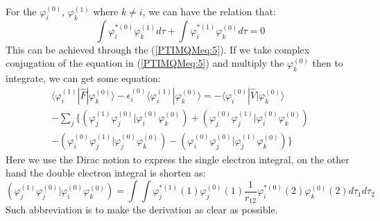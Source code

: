 For the $\varphi^{(0)}_{i}$, $\varphi^{(1)}_{k}$ where $k\neq i$, we
can have the relation that:
\begin{equation}\label{PTIMQMeq:9}
\int \varphi^{*(0)}_{i}\varphi^{(1)}_{k} d\tau  + \int
\varphi^{*(1)}_{i}\varphi^{(0)}_{k} d\tau = 0
\end{equation}
This can be achieved through the (\ref{PTIMQMeq:5}). If we take
complex conjugation of the equation in (\ref{PTIMQMeq:5}) and
multiply the $\varphi^{(0)}_{k}$ then to integrate, we can get some
equation:
\begin{multline}\label{PTIMQMeq:7}
\langle\varphi^{(1)}_{i}|\hat{F}|\varphi^{(0)}_{k}\rangle -
\epsilon^{(0)}_{i}\langle\varphi^{(1)}_{i}|\varphi^{(0)}_{k}\rangle
=
- \langle\varphi^{(0)}_{i}|\hat{V}|\varphi^{(0)}_{k}\rangle \\
-\sum_{j}\Bigg\{
\left(\varphi^{(1)}_{j}\varphi^{(0)}_{j}|\varphi^{(0)}_{i}\varphi^{(0)}_{k}\right)
+
\left(\varphi^{(0)}_{j}\varphi^{(1)}_{j}|\varphi^{(0)}_{i}\varphi^{(0)}_{k}\right)
\\
-
\left(\varphi^{(0)}_{i}\varphi^{(1)}_{j}|\varphi^{(0)}_{j}\varphi^{(0)}_{k}\right)
-
\left(\varphi^{(0)}_{i}\varphi^{(0)}_{j}|\varphi^{(1)}_{j}\varphi^{(0)}_{k}\right)
\Bigg\}
\end{multline}
Here we use the Dirac notion to express the single electron
integral, on the other hand the double electron integral is shorten
as:
\begin{equation}\label{}
\left(\varphi^{(1)}_{j}\varphi^{(0)}_{j}|\varphi^{(0)}_{i}\varphi^{(0)}_{k}\right)
= \int \int
\varphi^{*(1)}_{j}(1)\varphi^{(0)}_{j}(1)\frac{1}{r_{12}}
\varphi^{*(0)}_{i}(2)\varphi^{(0)}_{k}(2)d\tau_{1}d\tau_{2}
\end{equation}
Such abbreviation is to make the derivation as clear as possible.

